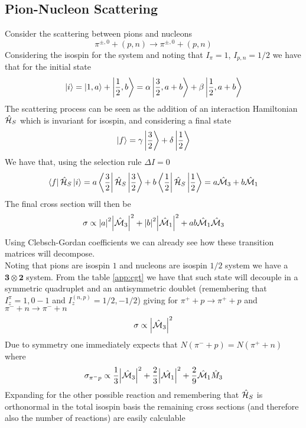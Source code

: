 \documentclass[../qm.tex]{subfiles}
\begin{document}
\subsection{Pion-Nucleon Scattering}
Consider the scattering between pions and nucleons
\begin{equation}
	\pi^{\pm,0}+(p,n)\to\pi^{\pm,0}+(p,n)
	\label{eq:pionnucleonscat}
\end{equation}
Considering the isospin for the system and noting that $I_\pi=1$, $I_{p,n}=1/2$ we have that for the initial state
\begin{equation}
	\ket{i}=\ket{1,a}+\ket{\frac{1}{2},b}=\alpha\ket{\frac{3}{2},a+b}+\beta\ket{\frac{1}{2},a+b}
	\label{eq:pionnucleoniso}
\end{equation}
The scattering process can be seen as the addition of an interaction Hamiltonian $\hat{\mathcal{H}}_S$ which is invariant for isospin, and considering a final state
\begin{equation}
	\ket{f}=\gamma\ket{\frac{3}{2}}+\delta\ket{\frac{1}{2}}
	\label{eq:finalpionnucleoniso}
\end{equation}
We have that, using the selection rule $\Delta I=0$
\begin{equation}
	\bra{f}\hat{\mathcal{H}}_S\ket{i}=a\bra{\frac{3}{2}}\hat{\mathcal{H}}_S\ket{\frac{3}{2}}+b\bra{\frac{1}{2}}\hat{\mathcal{H}}_S\ket{\frac{1}{2}}=a\hat{\mathcal{M}}_3+b\hat{\mathcal{M}}_1
	\label{eq:intmat}
\end{equation}
The final cross section will then be
\begin{equation}
	\sigma\propto\abs{a}^2\abs{\hat{\mathcal{M}}_3}^2+\abs{b}^2\abs{\hat{\mathcal{M}}_1}^2+ab\hat{\mathcal{M}}_1\hat{\mathcal{M}}_3
	\label{eq:strongcsisospin}
\end{equation}
Using Clebsch-Gordan coefficients we can already see how these transition matrices will decompose.\\
Noting that pions are isospin $1$ and nucleons are isospin $1/2$ system we have a $\mathbf{3}\otimes\mathbf{2}$ system. From the table \ref{app:cgt} we have that such state will decouple in a symmetric quadruplet and an antisymmetric doublet (remembering that $I_z^\pi=1,0-1$ and $I_z^{(n,p)}=1/2,-1/2$) giving for $\pi^++p\to\pi^++p$ and $\pi^-+n\to\pi^-+n$
\begin{equation}
	\sigma\propto\abs{\hat{\mathcal{M}}_3}^2
	\label{eq:sigma+pn}
\end{equation}
Due to symmetry one immediately expects that $N(\pi^-+p)=N(\pi^++n)$ where
\begin{equation}
	\sigma_{\pi^-p}\propto\frac{1}{3}\abs{\hat{\mathcal{M}}_3}^2+\frac{2}{3}\abs{\hat{\mathcal{M}_1}}^2+\frac{2}{9}\hat{\mathcal{M}}_1\hat{M}_3
	\label{eq:sigmapi-p}
\end{equation}
Expanding for the other possible reaction and remembering that $\hat{\mathcal{H}}_S$ is orthonormal in the total isospin basis the remaining cross sections (and therefore also the number of reactions) are easily calculable
\end{document}
